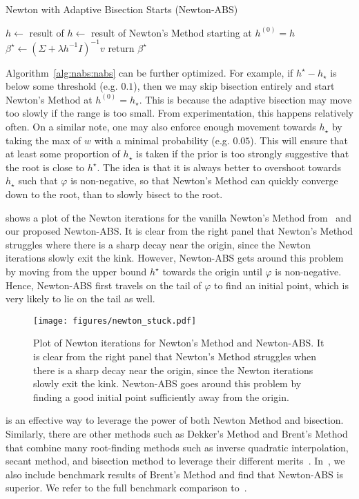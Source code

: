 \begin{algorithm}[t]
    \caption{Newton with Adaptive Bisection Starts (Newton-ABS)}\label{alg:nabs:nabs}
    $h \gets$ result of \;
     {
        $h \gets$ result of Newton's Method starting at $h^{(0)} = h$\;
    }
    $\beta^\star \gets (\Sigma + \lambda h^{-1} I)^{-1} v$\;
    return $\beta^\star$\;
\end{algorithm}

Algorithm~\ref{alg:nabs:nabs} can be further optimized.
For example, if $h^\star - h_\star$ is below some threshold (e.g. $0.1$),
then we may skip bisection entirely and start Newton's Method at $h^{(0)} = h_\star$.
This is because the adaptive bisection may move too slowly if the range is too small.
From experimentation, this happens relatively often.
On a similar note, one may also enforce enough movement towards $h_\star$
by taking the max of $w$ with a minimal probability (e.g. $0.05$).
This will ensure that at least some proportion of $h_\star$ is taken 
if the prior is too strongly suggestive that the root is close to $h^\star$.
The idea is that it is always better to overshoot towards $h_\star$ such that $\varphi$ is non-negative,
so that Newton's Method can quickly converge down to the root,
than to slowly bisect to the root.

 shows a plot of the Newton iterations for 
the vanilla Newton's Method from~ and our proposed Newton-ABS.
It is clear from the right panel that Newton's Method struggles 
where there is a sharp decay near the origin, since the Newton iterations
slowly exit the kink.
However, Newton-ABS gets around this problem by moving from the upper bound $h^\star$
towards the origin until $\varphi$ is non-negative.
Hence, Newton-ABS first travels on the tail of $\varphi$ to find an initial point,
which is very likely to lie on the tail as well.

\begin{figure}[t]
    \centering 
    \texttt{[image: figures/newton\_stuck.pdf]}
    \caption{Plot of Newton iterations for Newton's Method and Newton-ABS.
        It is clear from the right panel that Newton's Method struggles 
        when there is a sharp decay near the origin, since the Newton iterations
        slowly exit the kink.
        Newton-ABS goes around this problem by finding a good initial point
        sufficiently away from the origin.
    }
    \label{fig:newton-abs:stuck}
\end{figure}

 is an effective way to leverage the power of both Newton Method and bisection.
Similarly, there are other methods such as Dekker's Method and Brent's Method
that combine many root-finding methods such as inverse quadratic interpolation,
secant method, and bisection method to leverage their different merits~\citep{brent:2013,dekker:1969}.
In~,
we also include benchmark results of Brent's Method
and find that Newton-ABS is superior. 
We refer to the full benchmark comparison to~.
